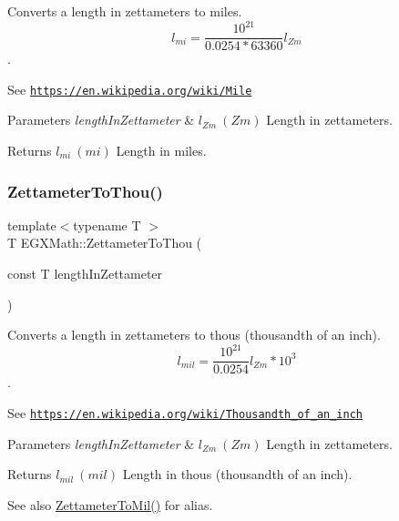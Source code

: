 Converts a length in zettameters to miles. \[ l_{mi}=\frac{10^{21}}{0.0254 * 63360} l_{Zm} \]. 

See \href{https://en.wikipedia.org/wiki/Mile}{\tt https\+://en.\+wikipedia.\+org/wiki/\+Mile} 
\begin{DoxyParams}{Parameters}
{\em length\+In\+Zettameter} & $ l_{Zm}\ (Zm)$ Length in zettameters. \\
\hline
\end{DoxyParams}
\begin{DoxyReturn}{Returns}
$ l_{mi}\ (mi)$ Length in miles. 
\end{DoxyReturn}
\mbox{\label{group___e_g_x_math-_conversions-_length_conversions-_zettameter-_imperial_gacd92ac6ab3300ca582966510e369a381}} 
\subsubsection{\texorpdfstring{Zettameter\+To\+Thou()}{ZettameterToThou()}}
{\footnotesize\ttfamily template$<$typename T $>$ \\
T E\+G\+X\+Math\+::\+Zettameter\+To\+Thou (\begin{DoxyParamCaption}\item[{const T}]{length\+In\+Zettameter }\end{DoxyParamCaption})}



Converts a length in zettameters to thous (thousandth of an inch). \[ l_{mil}= \frac{10^{21}}{0.0254} l_{Zm} * 10^{3} \]. 

See \href{https://en.wikipedia.org/wiki/Thousandth_of_an_inch}{\tt https\+://en.\+wikipedia.\+org/wiki/\+Thousandth\+\_\+of\+\_\+an\+\_\+inch} 
\begin{DoxyParams}{Parameters}
{\em length\+In\+Zettameter} & $ l_{Zm}\ (Zm)$ Length in zettameters. \\
\hline
\end{DoxyParams}
\begin{DoxyReturn}{Returns}
$ l_{mil}\ (mil)$ Length in thous (thousandth of an inch). 
\end{DoxyReturn}
\begin{DoxySeeAlso}{See also}
\mbox{\hyperlink{group___e_g_x_math-_conversions-_length_conversions-_zettameter-_imperial_gad42b99391f53e56136f2411915c5e28d}{Zettameter\+To\+Mil()}} for alias. 
\end{DoxySeeAlso}
\mbox{\label{group___e_g_x_math-_conversions-_length_conversions-_zettameter-_imperial_gaf0f61cf5764afa5022579c2e638a0c2e}} 
